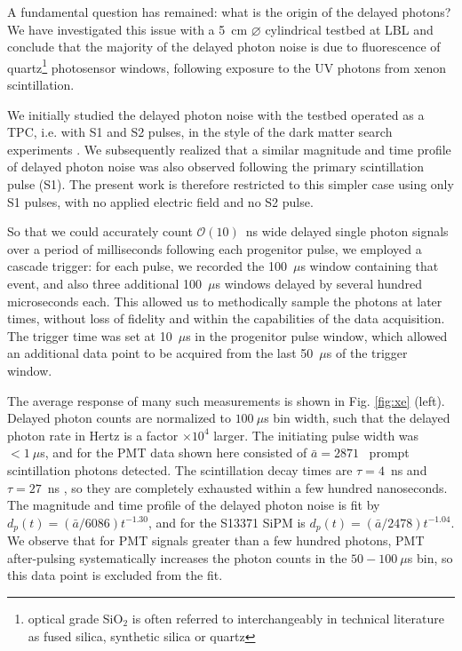 \documentclass[%
 reprint,
superscriptaddress,
nofootinbib,
 amsmath,amssymb,
 aps,
prl,
]{revtex4-2}
\begin{document}
A fundamental question has remained: what is the origin of the delayed photons? We have investigated this issue with a 5~cm $\varnothing$ cylindrical testbed at LBL and conclude that the majority of the delayed photon noise is due to fluorescence of quartz\footnote{optical grade SiO$_2$ is often referred to interchangeably in technical literature as fused silica, synthetic silica or quartz} photosensor windows, following exposure to the UV photons from xenon scintillation.

We initially\cite{Sorensen:2024idm} studied the delayed photon noise with the testbed operated as a TPC, i.e. with S1 and S2 pulses, in the style of the dark matter search experiments \cite{PandaX:2022aac,XENON:2024ijk}. We subsequently realized that a similar magnitude and time profile of delayed photon noise was also observed following the primary scintillation pulse (S1). The present work is therefore restricted to this simpler case using only S1 pulses, with no applied electric field and no S2 pulse. 

So that we could accurately count $\mathcal{O}(10)$~ns wide delayed single photon signals over a period of milliseconds following each progenitor pulse, we employed a cascade trigger: for each pulse, we recorded the 100~$\mu$s window containing that event, and also three additional 100~$\mu$s windows delayed by several hundred microseconds each. This allowed us to methodically sample the photons at later times, without loss of fidelity and within the capabilities of the data acquisition. The trigger time was set at 10~$\mu$s in the progenitor pulse window, which allowed an additional data point to be acquired from the last 50~$\mu$s of the trigger window. 



The average response of many such measurements is shown in Fig. \ref{fig:xe} (left). Delayed photon counts are normalized to $100~\mu$s bin width, such that the delayed photon rate in Hertz is a factor $\times10^4$ larger. The initiating pulse width was $<1~\mu$s, and for the PMT data shown here consisted of $\bar{a}=2871$~ prompt scintillation photons detected. The scintillation decay times are $\tau=4$~ns and $\tau=27$~ns \cite{}, so they are completely exhausted within a few hundred nanoseconds. The magnitude and time profile of the delayed photon noise is fit by $d_p(t) = (\bar{a}/6086) t^{-1.30}$, and for the S13371 SiPM is $d_p(t) = (\bar{a}/2478) t^{-1.04}$. We observe that for PMT signals greater than a few hundred photons, PMT after-pulsing \cite{} systematically increases the photon counts in the $50-100~\mu$s bin, so this data point is excluded from the fit. 
\end{document}
